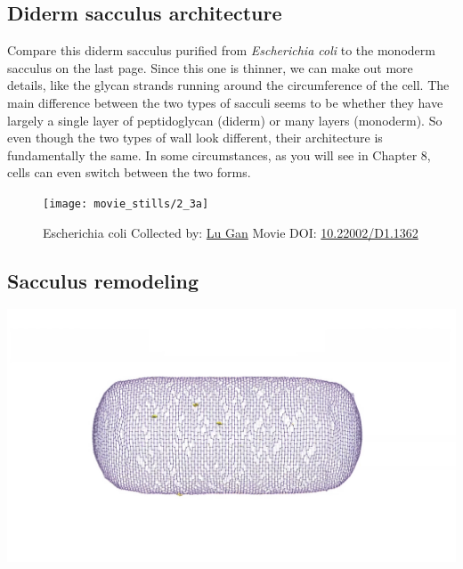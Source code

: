 \documentclass[]{tufte-book}
\begin{document}
\hypertarget{Diderm_sacculus_architecture}{\subsection{Diderm sacculus
architecture}\label{Diderm_sacculus_architecture}}

Compare this diderm sacculus purified from \emph{Escherichia coli} to
the monoderm sacculus on the last page. Since this one is thinner, we
can make out more details, like the glycan strands running around the
circumference of the cell. The main difference between the two types of
sacculi seems to be whether they have largely a single layer of
peptidoglycan (diderm) or many layers (monoderm). So even though the two
types of wall look different, their architecture is fundamentally the
same. In some circumstances, as you will see in Chapter 8, cells can
even switch between the two forms.





\begin{figure}
\texttt{[image: movie\_stills/2\_3a]} \caption[Escherichia coli Collected by: \protect\hyperlink{lu_gan}{Lu
Gan} Movie DOI:
\href{https://doi.org/10.22002/D1.1362}{10.22002/D1.1362}]{Escherichia coli Collected by: \protect\hyperlink{lu_gan}{Lu
Gan} Movie DOI:
\href{https://doi.org/10.22002/D1.1362}{10.22002/D1.1362}}\label{fig:2-3a}
\end{figure}

\subsection{Sacculus remodeling}\label{Sacculus_remodeling}

\includegraphics{img/schematics/2_3_2}
\end{document}
